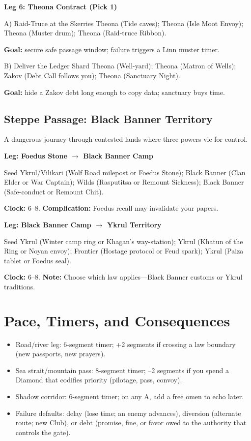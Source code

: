 \documentclass[11pt,letterpaper,twoside]{book}
\begin{document}
\textbf{Leg 6: Theona Contract (Pick 1)}
\begin{Leg}{A) Raid-Truce at the Skerries}
Theona \SuitSpade{} (Tide caves);
Theona \SuitHeart{} (Isle Moot Envoy);
Theona \SuitClub{} (Muster drum);
Theona \SuitDiamond{} (Raid-truce Ribbon).
\end{Leg}
\textbf{Goal:} secure safe passage window; failure triggers a Linn muster timer.

\begin{Leg}{B) Deliver the Ledger Shard}
Theona \SuitSpade{} (Well-yard);
Theona \SuitHeart{} (Matron of Wells);
Zakov \SuitClub{} (Debt Call follows you);
Theona \SuitDiamond{} (Sanctuary Night).
\end{Leg}
\textbf{Goal:} hide a Zakov debt long enough to copy data; sanctuary buys time.

\subsection{Steppe Passage: Black Banner Territory}
A dangerous journey through contested lands where three powers vie for control.

\textbf{Leg: Foedus Stone $\rightarrow$ Black Banner Camp}
\begin{Leg}{Seed}
Ykrul/Vilikari \SuitSpade{} (Wolf Road milepost or Foedus Stone);
Black Banner \SuitHeart{} (Clan Elder or War Captain);
Wilds \SuitClub{} (Rasputitsa or Remount Sickness);
Black Banner \SuitDiamond{} (Safe-conduct or Remount Chit).
\end{Leg}
\textbf{Clock:} 6--8. \textbf{Complication:} Foedus recall may invalidate your papers.

\textbf{Leg: Black Banner Camp $\rightarrow$ Ykrul Territory}
\begin{Leg}{Seed}
Ykrul \SuitSpade{} (Winter camp ring or Khagan's way-station);
Ykrul \SuitHeart{} (Khatun of the Ring or Noyan envoy);
Frontier \SuitClub{} (Hostage protocol or Feud spark);
Ykrul \SuitDiamond{} (Paiza tablet or Foedus seal).
\end{Leg}
\textbf{Clock:} 6--8. \textbf{Note:} Choose which law applies---Black Banner customs or Ykrul traditions.

\section{Pace, Timers, and Consequences}

\begin{itemize}
\item Road/river leg: 6-segment timer; +2 segments if crossing a law boundary (new passports, new prayers).
\item Sea strait/mountain pass: 8-segment timer; --2 segments if you spend a Diamond that codifies priority (pilotage, pass, convoy).
\item Shadow corridor: 6-segment timer; on any A, add a free omen to echo later.
\item Failure defaults: delay (lose time; an enemy advances), diversion (alternate route; new Club), or debt (promise, fine, or favor owed to the authority that controls the gate).
\end{itemize}
\end{document}
